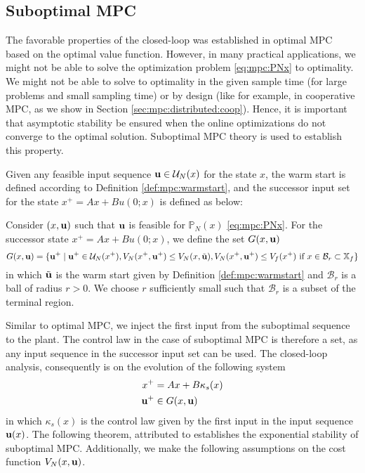 \subsection{Suboptimal MPC}
\label{sec:mpc:centralized:suboptimal}
The favorable properties of the closed-loop was established in optimal
MPC based on the optimal value function. However, in many practical
applications, we might not be able to solve the optimization problem
\eqref{eq:mpc:PNx} to optimality. We might not be able to solve to
optimality in the given sample time (for large 
problems and small sampling time) or by design (like for
example, in cooperative MPC, as we show in Section
\ref{sec:mpc:distributed:coop}). Hence, it is important that asymptotic
stability be ensured when the online optimizations do not converge to
the optimal solution. Suboptimal MPC theory is used to establish this
property. 

Given any feasible input sequence $\mathbf{u} \in \mathcal{U}_N(x)$ for the
state $x$, the warm start is defined according to Definition
\ref{def:mpc:warmstart}, and the successor input set for the state
$x^+=Ax+Bu(0;x)$ is defined as
below:
\begin{definition}
\label{def:mpc:successor-input-set}
Consider $(x,\mathbf{u})$ such that $\mathbf{u}$ is feasible for
$\mathbb{P}_N(x)$ \eqref{eq:mpc:PNx}.  For the  successor state 
$x^+ = Ax+Bu(0;x)$, we define the set $G(x,\mathbf{u})$
\begin{equation}
\label{eq:mpc:succesor-input-set}
G(x,\mathbf{u}) = \lbrace \mathbf{u}^+ \mid \mathbf{u}^+ \in
\mathcal{U}_N(x^+), V_N(x^+,\mathbf{u}^+)\leq V_N(x,\tilde{\mathbf{u}}), 
V_N(x^+,\mathbf{u}^+) \leq V_f(x^+) \text{~if~} x\in \mathcal{B}_r \subset \mathbb{X}_f \rbrace
\end{equation}
in which $\tilde{\mathbf{u}}$ is the warm start given by Definition 
\ref{def:mpc:warmstart} and $\mathcal{B}_r$ is a ball of radius $r>0$. We
choose $r$ sufficiently small such that  
$\mathcal{B}_r$ is a subset of the terminal region.  
\end{definition}

Similar to optimal MPC, we inject the first input from the suboptimal
sequence to the plant. The control law in the case of suboptimal MPC
is therefore a set, as any input sequence in the successor input set
can be used. The closed-loop analysis, consequently is on the
evolution of the following system
\begin{align}
x^+ &= Ax+ B\kappa_s(x) \label{eq:mpc:suboptimal:xcl} \\
\mathbf{u}^+ &\in G(x,\mathbf{u})  \label{eq:mpc:suboptimal:ucl}
\end{align}
in which $\kappa_s(x)$ is the control law given by the first input in
the input sequence $\mathbf{u}(x)$. The following theorem, attributed to
\citet{pannocchia:rawlings:wright:2011} establishes the exponential
stability of suboptimal MPC. Additionally, we make the 
following assumptions on the cost function $V_N(x,\mathbf{u})$.

